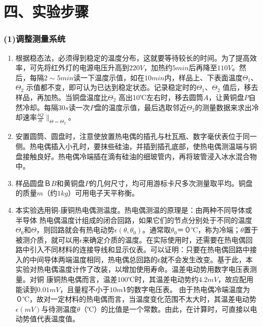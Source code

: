 \documentclass[11pt,a4paper,oneside]{article}
\begin{document}
\section*{四、实验步骤}

\subsubsection*{(1)调整测量系统}
\begin{enumerate}
\item 根据稳态法，必须得到稳定的温度分布，这就要等待较长的时间。为了提高效率，可先将红外灯的电源电压升高到$220V$，加热约$5min$后再降至$110V$。然后，每隔$2\sim 5min$读一下温度示值，如在$10min$内，样品上、下表面温度$\Theta _1$、$\Theta _2$ 示值都不变，即可认为已达到稳定状态。记录稳定时的${\Theta} _1$、${\Theta}_2$ 值后，移去样品，再加热。当铜盘温度比${\Theta}_2$ 高出10℃左右时，移去圆筒$A$，让黄铜盘$P$自然冷却。每隔$30s$读一次$P$盘的温度示值，最后选取邻近$\Theta _2$的测量数据来求出冷却速率$\displaystyle\frac{\delta Q}{\delta t}\|_{\Theta =\Theta _2}$。
\item 安置圆筒、圆盘时，注意使放置热电偶的插孔与杜瓦瓶、数字毫伏表位于同一侧。热电偶插入小孔时，要抹些硅油，并插到插孔底部，使热电偶测温端与铜盘接触良好。热电偶冷端插在滴有硅油的细玻管内，再将玻管浸入冰水混合物中。
\item 样品圆盘Ｂ$B$和黄铜盘$P$的几何尺寸，均可用游标卡尺多次测量取平均。铜盘的质量$m$（约$1kg$）可用电子天平称衡。
\item 本实验选用铜-康铜热电偶测温度。热电偶测温的原理是：由两种不同导体或半导体 热电偶温度计组成的闭合回路，如果它们的节点分别处于不同的温度$\Theta _0$和$\Theta $，则回路就会有热电动势$\epsilon (\theta ,\theta _0)$。通常取$\theta _0$＝０℃，称为冷端；$\theta $置于被测介质，就可以用$\epsilon$来确定介质的温度。在实际使用时，还需要在热电偶回路中引入不同材料的连接导线和显示仪表。可以证明：只要在热电偶回路中接入的中间导体两端温度相同，热电偶总回路的ε就不会发生改变。基于此，本实验对热电偶温度计作了改装，以增加使用寿命。温差电动势用数字电压表测量。对铜 康铜热电偶而言，温差100℃时，其温差电动势约$4.2mV$，故应配用能读到$0.01mV$，且量程不小于$10mV$的数字电压表。
由于热电偶冷端温度为０℃，故对一定材料的热电偶而言，当温度变化范围不太大时，其温差电动势$\epsilon(mV)$与待测温度$\theta $（℃）的比值是一个常数。由此，在计算时，可直接以电动势值代表温度值。
\end{enumerate}
\end{document}
